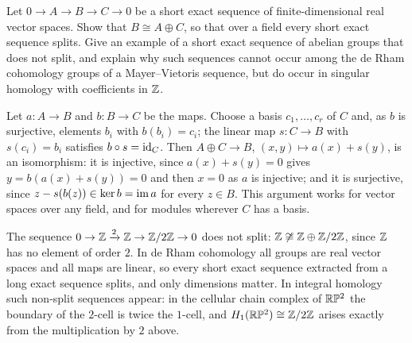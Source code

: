 \begin{exercise}\label{de-rham:exercise-dimension-in-sequences}
Let $0 \to A \to B \to C \to 0$ be a short exact sequence of finite-dimensional real vector spaces. Show that $B \cong A \oplus C$, so that over a field every short exact sequence splits. Give an example of a short exact
sequence of abelian groups that does not split, and explain why such sequences cannot occur among the de Rham cohomology groups of a Mayer--Vietoris sequence, but do occur in singular homology with
coefficients in $\mathbb{Z}$.
\end{exercise}

\begin{solution}
Let $a \colon A \to B$ and $b \colon B \to C$ be the maps. Choose a basis $c_1, \ldots, c_r$ of $C$ and, as $b$ is surjective, elements $b_i$ with $b(b_i) = c_i$; the linear map $s \colon C \to B$ with $s(c_i) = b_i$ satisfies
$b \circ s = \mathrm{id}_C$. Then $A \oplus C \to B$, $(x, y) \mapsto a(x) + s(y)$, is an isomorphism: it is injective, since $a(x) + s(y) = 0$ gives $y = b(a(x) + s(y)) = 0$ and then $x = 0$ as $a$ is injective; and it is surjective, since
$z - s(b(z)) \in \ker b = \operatorname{im} a$ for every $z \in B$. This argument works for vector spaces over any field, and for modules wherever $C$ has a basis.

The sequence $0 \to \mathbb{Z} \xrightarrow{2} \mathbb{Z} \to \mathbb{Z}/2\mathbb{Z} \to 0$ does not split: $\mathbb{Z} \not\cong \mathbb{Z} \oplus \mathbb{Z}/2\mathbb{Z}$, since $\mathbb{Z}$ has no element of order $2$. In de Rham cohomology all groups are real vector spaces and all
maps are linear, so every short exact sequence extracted from a long exact sequence splits, and only dimensions matter. In integral homology such non-split sequences appear: in the cellular chain complex of
$\mathbb{R}\mathbb{P}^2$ the boundary of the $2$-cell is twice the $1$-cell, and $H_1(\mathbb{R}\mathbb{P}^2) \cong \mathbb{Z}/2\mathbb{Z}$ arises exactly from the multiplication by $2$ above.
\end{solution}
